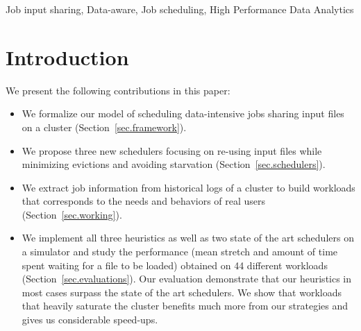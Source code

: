 \documentclass[conference,10pt]{IEEEtran}
\begin{document}
\begin{abstract}
  
  

  
\end{abstract}


\begin{IEEEkeywords}
Job input sharing,
Data-aware,
Job scheduling,
High Performance Data Analytics
\end{IEEEkeywords}

\section{Introduction}\label{sec.introduction}


We present the following contributions in this paper:
\begin{itemize}
	\item We formalize our model of scheduling data-intensive jobs sharing input files on a cluster (Section~\ref{sec.framework}).
	\item We propose three new schedulers focusing on re-using input files while minimizing evictions and avoiding starvation (Section~\ref{sec.schedulers}).
	\item We extract job information from historical logs of a cluster to build workloads that corresponds to the needs and behaviors of real users (Section~\ref{sec.working}).
	\item We implement all three heuristics as well as two state of the art schedulers on a simulator and study the performance (mean stretch and amount of time spent waiting for a file to be loaded) obtained on 44 different workloads (Section~\ref{sec.evaluations}).
	Our evaluation demonstrate that our heuristics in most cases surpass the state of the art schedulers.
	We show that workloads that heavily saturate the cluster benefits much more from our strategies and gives us considerable speed-ups.
\end{itemize}
\end{document}
